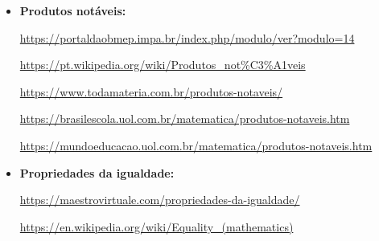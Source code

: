 \documentclass[a4paper, 12pt]{article}
\begin{document}
\begin{itemize}
\item   \textbf{Produtos notáveis:} 

    \url{https://portaldaobmep.impa.br/index.php/modulo/ver?modulo=14}

    \url{https://pt.wikipedia.org/wiki/Produtos_not\%C3\%A1veis}

    \url{https://www.todamateria.com.br/produtos-notaveis/}

    \url{https://brasilescola.uol.com.br/matematica/produtos-notaveis.htm}

    \url{https://mundoeducacao.uol.com.br/matematica/produtos-notaveis.htm} 

\item   \textbf{Propriedades da igualdade:} 

    \url{https://maestrovirtuale.com/propriedades-da-igualdade/}

    \url{https://en.wikipedia.org/wiki/Equality_(mathematics)} 
\end{itemize}
\end{document}
